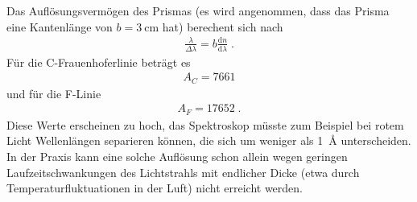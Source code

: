     Das Auflösungsvermögen des Prismas (es wird angenommen, dass das Prisma eine Kantenlänge von $b=\SI{3}{\centi\m}$ hat) berechent sich nach
    \begin{align}\label{equ:auloes}
        \frac{\lambda}{\Delta\lambda} = b \frac{\mathrm{d}n}{\mathrm{d}\lambda}\;.
    \end{align}
    Für die C-Frauenhoferlinie beträgt es
    \begin{align}
            A_C = \num{7661}
    \end{align}
    und für die F-Linie
    \begin{align}
        A_F = \num{17652} \;.
    \end{align}
    Diese Werte erscheinen zu hoch, das Spektroskop müsste zum Beispiel bei rotem Licht Wellenlängen separieren können, die sich um weniger als \SI{1}{\angstrom} unterscheiden. In der Praxis kann eine solche Auflösung schon allein wegen geringen Laufzeitschwankungen des Lichtstrahls mit endlicher Dicke (etwa durch Temperaturfluktuationen in der Luft) nicht erreicht werden. 